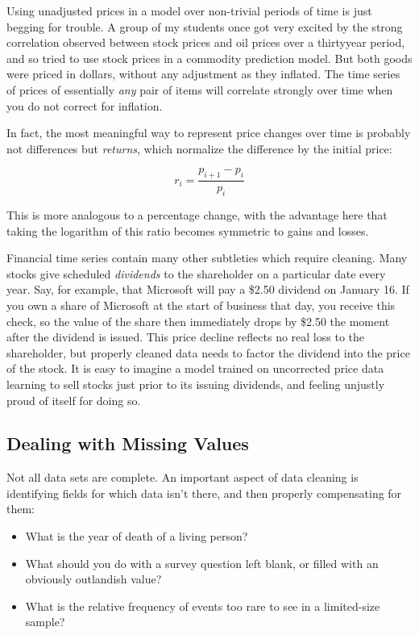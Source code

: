 \documentclass[10pt]{article}
\begin{document}
Using unadjusted prices in a model over non-trivial periods of time is just begging for trouble. A group of my students once got very excited by the strong correlation observed between stock prices and oil prices over a thirtyyear period, and so tried to use stock prices in a commodity prediction model. But both goods were priced in dollars, without any adjustment as they inflated. The time series of prices of essentially \textit{any} pair of items will correlate strongly over time when you do not correct for inflation.

In fact, the most meaningful way to represent price changes over time is probably not differences but \textit{returns}, which normalize the difference by the initial price:

\[
r_{i}=\frac{p_{i+1}-p_{i}}{p_{i}}
\]

This is more analogous to a percentage change, with the advantage here that taking the logarithm of this ratio becomes symmetric to gains and losses.

Financial time series contain many other subtleties which require cleaning. Many stocks give scheduled \textit{dividends} to the shareholder on a particular date every year. Say, for example, that Microsoft will pay a \$2.50 dividend on January 16. If you own a share of Microsoft at the start of business that day, you receive this check, so the value of the share then immediately drops by \$2.50 the moment after the dividend is issued. This price decline reflects no real loss to the shareholder, but properly cleaned data needs to factor the dividend into the price of the stock. It is easy to imagine a model trained on uncorrected price data learning to sell stocks just prior to its issuing dividends, and feeling unjustly proud of itself for doing so.

\subsection*{Dealing with Missing Values}

Not all data sets are complete. An important aspect of data cleaning is identifying fields for which data isn't there, and then properly compensating for them:

\begin{itemize}
    \item What is the year of death of a living person?
    \item What should you do with a survey question left blank, or filled with an obviously outlandish value?
    \item What is the relative frequency of events too rare to see in a limited-size sample?
\end{itemize}
\end{document}
